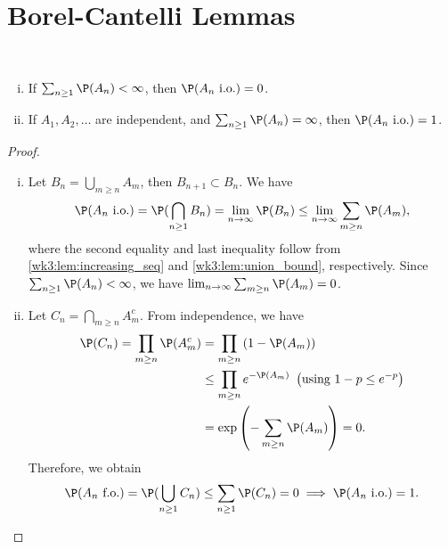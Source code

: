 \documentclass[../aipt.tex]{subfiles}
\begin{document}
\section{Borel-Cantelli Lemmas}
\begin{Lemma} \label{wk6:lemma:borel_cantelli}\
\begin{enumerate}[(i)]
\item If $\sum_{n \geq 1} \P(A_n) < \infty$, then $\P(A_n \io)= 0$.
\item If $A_1, A_2, \ldots$ are independent, and $\sum_{n \geq 1} \P(A_n) = \infty$, then $\P(A_n \io) = 1$.
\end{enumerate}
\end{Lemma}
%
\begin{proof}\
\begin{enumerate}[(i)]
\item
Let $B_n = \bigcup_{m \geq n}A_m$, then $B_{n+1} \subset B_n$. We have
\begin{align*}
\P(A_n \io) 
= \P(\bigcap_{n \geq 1} B_n) 
= \lim_{n \to \infty} \P(B_n) 
\leq \lim_{n \to \infty} \sum_{m \geq n} \P(A_m),										
\end{align*}
where the second equality and last inequality follow from \cref{wk3:lem:increasing_seq} and \cref{wk3:lem:union_bound}, respectively. Since $\sum_{n \geq 1} \P(A_n) < \infty$, we have $\lim_{n \to \infty} \sum_{m \geq n} \P(A_m) = 0$.

\item
Let $C_n = \bigcap_{m \geq n} A_m^c$. From independence, we have
\begin{align*}
\P(C_n) 
= \prod_{m \geq n} \P(A_m^c)
&= \prod_{m \geq n} \left(1 - \P(A_m)\right) \\
&\leq \prod_{m \geq n} e^{-\P(A_m)} \ \left(\text{using }  1 - p \leq e^{-p}\right)	\\
&= \exp\left(-\sum_{m \geq n} \P(A_m)\right) = 0.	
\end{align*}
Therefore, we obtain
\begin{align*}
\P(A_n\ \text{f.o.}) = \P(\bigcup_{n \geq 1}C_n) \leq \sum_{n \geq 1} \P(C_n) = 0 \implies \P(A_n\io) = 1.
\end{align*}
\end{enumerate}
\end{proof}
\end{document}
